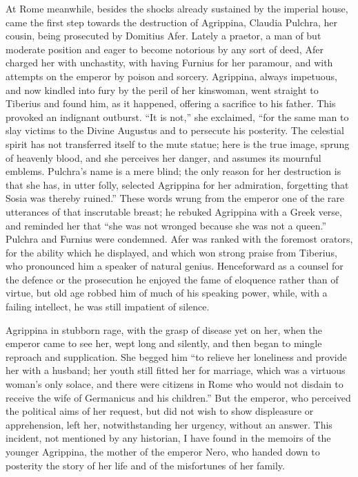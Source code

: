 
At Rome meanwhile, besides the shocks already sustained by the imperial house, came the first step towards the destruction of Agrippina, Claudia Pulchra, her cousin, being prosecuted by Domitius Afer. Lately a praetor, a man of but moderate position and eager to become notorious by any sort of deed, Afer charged her with unchastity, with having Furnius for her paramour, and with attempts on the emperor by poison and sorcery. Agrippina, always impetuous, and now kindled into fury by the peril of her kinswoman, went straight to Tiberius and found him, as it happened, offering a sacrifice to his father. This provoked an indignant outburst. ``It is not,'' she exclaimed, ``for the same man to slay victims to the Divine Augustus and to persecute his posterity. The celestial spirit has not transferred itself to the mute statue; here is the true image, sprung of heavenly blood, and she perceives her danger, and assumes its mournful emblems. Pulchra's name is a mere blind; the only reason for her destruction is that she has, in utter folly, selected Agrippina for her admiration, forgetting that Sosia was thereby ruined.'' These words wrung from the emperor one of the rare utterances of that inscrutable breast; he rebuked Agrippina with a Greek verse, and reminded her that ``she was not wronged because she was not a queen.'' Pulchra and Furnius were condemned. Afer was ranked with the foremost orators, for the ability which he displayed, and which won strong praise from Tiberius, who pronounced him a speaker of natural genius. Henceforward as a counsel for the defence or the prosecution he enjoyed the fame of eloquence rather than of virtue, but old age robbed him of much of his speaking power, while, with a failing intellect, he was still impatient of silence.


Agrippina in stubborn rage, with the grasp of disease yet on her, when the emperor came to see her, wept long and silently, and then began to mingle reproach and supplication. She begged him ``to relieve her loneliness and provide her with a husband; her youth still fitted her for marriage, which was a virtuous woman's only solace, and there were citizens in Rome who would not disdain to receive the wife of Germanicus and his children.'' But the emperor, who perceived the political aims of her request, but did not wish to show displeasure or apprehension, left her, notwithstanding her urgency, without an answer. This incident, not mentioned by any historian, I have found in the memoirs of the younger Agrippina, the mother of the emperor Nero, who handed down to posterity the story of her life and of the misfortunes of her family.

